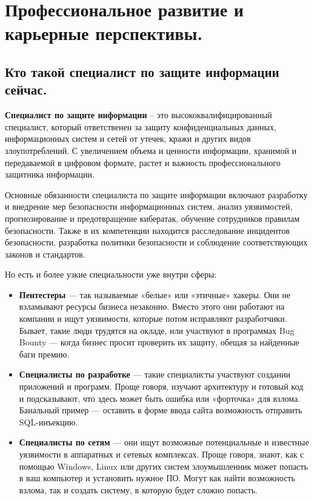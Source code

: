\section{Профессиональное развитие и карьерные перспективы.}
\subsection{Кто такой специалист по защите информации сейчас.}
\textbf{Специалист по защите информации} – это высококвалифицированный специалист, который ответственен за защиту конфиденциальных 
данных, информационных систем и сетей от утечек, кражи и других видов злоупотреблений. С увеличением объема и ценности 
информации, хранимой и передаваемой в цифровом формате, растет и важность профессионального защитника информации.

Основные обязанности специалиста по защите информации включают разработку и внедрение мер безопасности информационных систем, 
анализ уязвимостей, прогнозирование и предотвращение кибератак, обучение сотрудников правилам безопасности. Также в их 
компетенции находится расследование инцидентов безопасности, разработка политики безопасности и соблюдение соответствующих 
законов и стандартов.

Но есть и более узкие специальности уже внутри сферы:
\begin{itemize}
    \item \textbf{Пентестеры} — так называемые «белые» или «этичные» хакеры. Они не взламывают ресурсы бизнеса незаконно. Вместо 
    этого они работают на компании и ищут уязвимости, которые потом исправляют разработчики. Бывает, такие люди трудятся на 
    окладе, или участвуют в программах Bug Bounty — когда бизнес просит проверить их защиту, обещая за найденные баги премию.
    \item \textbf{Специалисты по разработке} — такие специалисты участвуют создании приложений и программ. Проще говоря, 
    изучают архитектуру и готовый код и подсказывают, что здесь может быть ошибка или «форточка» для взлома. Банальный пример 
    — оставить в форме ввода сайта возможность отправить SQL-инъекцию.
    \item \textbf{Специалисты по сетям} — они ищут возможные потенциальные и известные уязвимости в аппаратных и сетевых 
    комплексах. Проще говоря, знают, как с помощью Windows, Linux или других систем злоумышленник может попасть в ваш 
    компьютер и установить нужное ПО. Могут как найти возможность взлома, так и создать систему, в которую будет сложно 
    попасть.
\end{itemize}

